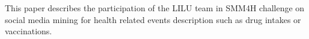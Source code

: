 This paper describes the participation of the LILU team in SMM4H challenge on social media mining for health related events description such as drug intakes or vaccinations.
